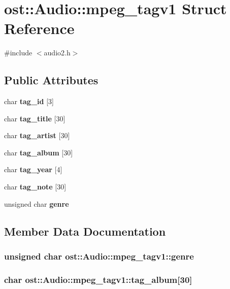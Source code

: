 \section{ost::Audio::mpeg\_\-tagv1 Struct Reference}
\label{structost_1_1_audio_1_1mpeg__tagv1}


{\ttfamily \#include $<$audio2.h$>$}\subsection*{Public Attributes}
\begin{DoxyCompactItemize}
\item 
char {\bf tag\_\-id} [3]
\item 
char {\bf tag\_\-title} [30]
\item 
char {\bf tag\_\-artist} [30]
\item 
char {\bf tag\_\-album} [30]
\item 
char {\bf tag\_\-year} [4]
\item 
char {\bf tag\_\-note} [30]
\item 
unsigned char {\bf genre}
\end{DoxyCompactItemize}


\subsection{Member Data Documentation}
\subsubsection[{genre}]{\setlength{\rightskip}{0pt plus 5cm}unsigned char {\bf ost::Audio::mpeg\_\-tagv1::genre}}\label{structost_1_1_audio_1_1mpeg__tagv1_a0e19702524085e531f8cf9d8e227598c}
\subsubsection[{tag\_\-album}]{\setlength{\rightskip}{0pt plus 5cm}char {\bf ost::Audio::mpeg\_\-tagv1::tag\_\-album}[30]}\label{structost_1_1_audio_1_1mpeg__tagv1_a3d2dc3ef39cd5cf32ed00c88719a5b08}
